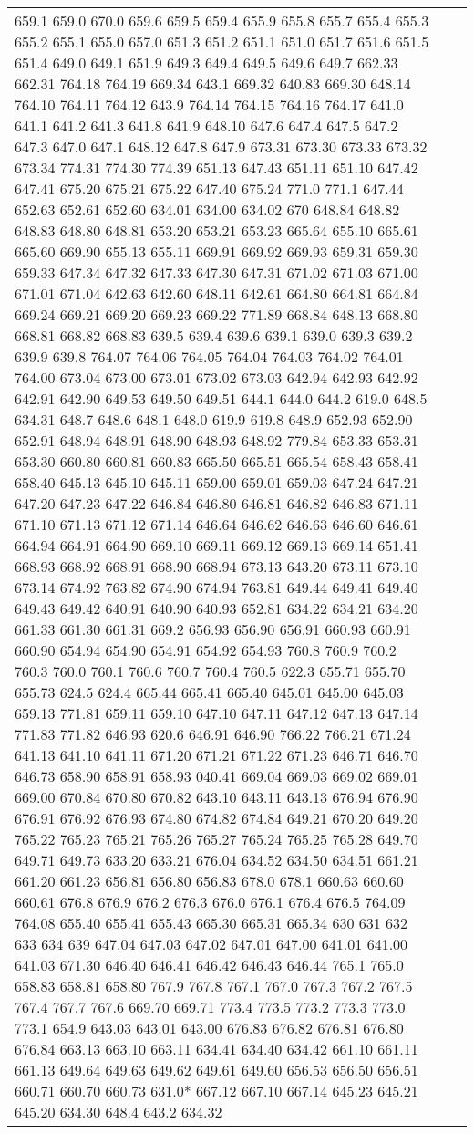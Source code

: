\begin{longtable}{|R{.05in}|L{.65in}||L{5.65in}|}
659.1 659.0 670.0 659.6 659.5 659.4 655.9 655.8 655.7 655.4 655.3 655.2 655.1 655.0 657.0 651.3 651.2 651.1 651.0 651.7 651.6 651.5 651.4 649.0 649.1 651.9 649.3 649.4 649.5 649.6 649.7 662.33 662.31 764.18 764.19 669.34 643.1 669.32 640.83 669.30 648.14 764.10 764.11 764.12 643.9 764.14 764.15 764.16 764.17 641.0 641.1 641.2 641.3 641.8 641.9 648.10 647.6 647.4 647.5 647.2 647.3 647.0 647.1 648.12 647.8 647.9 673.31 673.30 673.33 673.32 673.34 774.31 774.30 774.39 651.13 647.43 651.11 651.10 647.42 647.41 675.20 675.21 675.22 647.40 675.24 771.0 771.1 647.44 652.63 652.61 652.60 634.01 634.00 634.02 670 648.84 648.82 648.83 648.80 648.81 653.20 653.21 653.23 665.64 655.10 665.61 665.60 669.90 655.13 655.11 669.91 669.92 669.93 659.31 659.30 659.33 647.34 647.32 647.33 647.30 647.31 671.02 671.03 671.00 671.01 671.04 642.63 642.60 648.11 642.61 664.80 664.81 664.84 669.24 669.21 669.20 669.23 669.22 771.89 668.84 648.13 668.80 668.81 668.82 668.83 639.5 639.4 639.6 639.1 639.0 639.3 639.2 639.9 639.8 764.07 764.06 764.05 764.04 764.03 764.02 764.01 764.00 673.04 673.00 673.01 673.02 673.03 642.94 642.93 642.92 642.91 642.90 649.53 649.50 649.51 644.1 644.0 644.2 619.0 648.5 634.31 648.7 648.6 648.1 648.0 619.9 619.8 648.9 652.93 652.90 652.91 648.94 648.91 648.90 648.93 648.92 779.84 653.33 653.31 653.30 660.80 660.81 660.83 665.50 665.51 665.54 658.43 658.41 658.40 645.13 645.10 645.11 659.00 659.01 659.03 647.24 647.21 647.20 647.23 647.22 646.84 646.80 646.81 646.82 646.83 671.11 671.10 671.13 671.12 671.14 646.64 646.62 646.63 646.60 646.61 664.94 664.91 664.90 669.10 669.11 669.12 669.13 669.14 651.41 668.93 668.92 668.91 668.90 668.94 673.13 643.20 673.11 673.10 673.14 674.92 763.82 674.90 674.94 763.81 649.44 649.41 649.40 649.43 649.42 640.91 640.90 640.93 652.81 634.22 634.21 634.20 661.33 661.30 661.31 669.2 656.93 656.90 656.91 660.93 660.91 660.90 654.94 654.90 654.91 654.92 654.93 760.8 760.9 760.2 760.3 760.0 760.1 760.6 760.7 760.4 760.5 622.3 655.71 655.70 655.73 624.5 624.4 665.44 665.41 665.40 645.01 645.00 645.03 659.13 771.81 659.11 659.10 647.10 647.11 647.12 647.13 647.14 771.83 771.82 646.93 620.6 646.91 646.90 766.22 766.21 671.24 641.13 641.10 641.11 671.20 671.21 671.22 671.23 646.71 646.70 646.73 658.90 658.91 658.93 040.41 669.04 669.03 669.02 669.01 669.00 670.84 670.80 670.82 643.10 643.11 643.13 676.94 676.90 676.91 676.92 676.93 674.80 674.82 674.84 649.21 670.20 649.20 765.22 765.23 765.21 765.26 765.27 765.24 765.25 765.28 649.70 649.71 649.73 633.20 633.21 676.04 634.52 634.50 634.51 661.21 661.20 661.23 656.81 656.80 656.83 678.0 678.1 660.63 660.60 660.61 676.8 676.9 676.2 676.3 676.0 676.1 676.4 676.5 764.09 764.08 655.40 655.41 655.43 665.30 665.31 665.34 630 631 632 633 634 639 647.04 647.03 647.02 647.01 647.00 641.01 641.00 641.03 671.30 646.40 646.41 646.42 646.43 646.44 765.1 765.0 658.83 658.81 658.80 767.9 767.8 767.1 767.0 767.3 767.2 767.5 767.4 767.7 767.6 669.70 669.71 773.4 773.5 773.2 773.3 773.0 773.1 654.9 643.03 643.01 643.00 676.83 676.82 676.81 676.80 676.84 663.13 663.10 663.11 634.41 634.40 634.42 661.10 661.11 661.13 649.64 649.63 649.62 649.61 649.60 656.53 656.50 656.51 660.71 660.70 660.73 631.0* 667.12 667.10 667.14 645.23 645.21 645.20 634.30 648.4 643.2 634.32 
\end{longtable}
